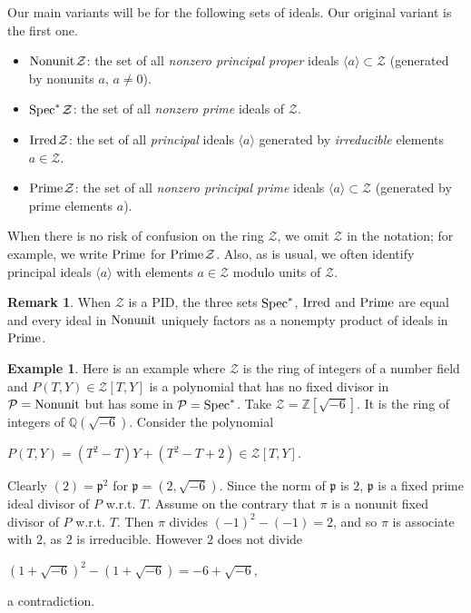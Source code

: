\documentclass[11pt,a4paper,reqno]{amsart}
\def\Z{\mathbb{Z}}
\def\Q{\mathbb{Q}}
\theoremstyle{definition}
\newtheorem{exa}[thm]{Example}
\newtheorem{rmk}[thm]{Remark}
\begin{document}
Our main variants will be for the following sets of ideals. Our original variant is the first one.


\begin{itemize}
\item ${\rm Nonunit}\hskip 1pt {\mathcal Z}$: the set of all \emph{nonzero principal proper} ideals $\langle a\rangle \subset {\mathcal Z}$ (generated by nonunits $a$, $a\not=0$).
\item ${\rm Spec}^\ast\hskip 1pt {\mathcal Z}$: the set of all \emph{nonzero prime} ideals of ${\mathcal Z}$.
\item ${\rm Irred}\hskip 1pt {\mathcal Z}$: the set of all \emph{principal} ideals $\langle a\rangle$ generated by \emph{irreducible} elements $a\in {\mathcal Z}$.
\item ${\rm Prime}\hskip 1pt {\mathcal Z}$: the set of all \emph{nonzero principal prime} ideals $\langle a\rangle\subset {\mathcal Z}$ (generated by prime elements $a$).
\end{itemize}

\noindent
When there is no risk of confusion on the ring ${\mathcal Z}$, we omit ${\mathcal Z}$ in the notation; for example, we write ${\rm Prime}$ for ${\rm Prime}\hskip 1pt {\mathcal Z}$.
Also, as is usual, we often identify principal ideals $\langle a\rangle$ with elements $a\in {\mathcal Z}$ modulo units of ${\mathcal Z}$. 

\begin{rmk} \label{rem:PID-context}
When ${\mathcal Z}$ is a PID, the three sets ${\rm Spec}^\ast$,
${\rm Irred}$ and ${\rm Prime}$ are equal and every ideal in ${\rm Nonunit}$ uniquely factors as a nonempty product of ideals in ${\rm Prime}$. 
\end{rmk}


\begin{exa}\label{exa:examfixide} Here is an example where ${\mathcal Z}$ is the ring of integers of a number field and $P(T,Y)\in {\mathcal Z}[T,Y]$ is a polynomial that has no fixed divisor in ${\mathcal P}= {\rm Nonunit}$ but has some in ${\mathcal P}= {\rm Spec}^\ast$. Take $\mathcal Z=\Z[\sqrt{-6}]$. It is the ring of integers of $\Q(\sqrt{-6})$. Consider the polynomial
\vskip 1mm

\centerline{$P(T,Y)=(T^2-T)Y+(T^2-T+2) \in \mathcal Z[T,Y]
$.}
\vskip 1mm

\noindent
Clearly
$
(2)= \mathfrak{p}^2
$ for $\mathfrak{p}=(2,\sqrt{-6})$. Since the norm of $\mathfrak{p}$ is $2$, $\mathfrak{p}$ is a fixed prime ideal divisor of $P$ \hbox{w.r.t.} $T$. Assume on the contrary that $\pi$ is a nonunit fixed divisor of $P$ \hbox{w.r.t.} $T$. Then $\pi$ divides $(-1)^2-(-1)=2$, and so $\pi$ is associate with $2$, as $2$ is irreducible. However $2$ does not divide
\vskip 1mm

\centerline{$(1+\sqrt{-6})^2-(1+\sqrt{-6})=-6+\sqrt{-6},
$}
\vskip 1mm

\noindent
a contradiction.
\end{exa}
\end{document}
